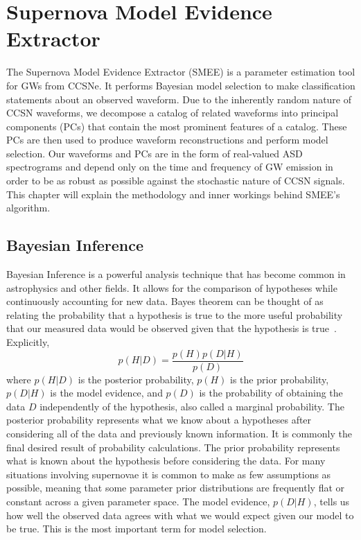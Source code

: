 \chapter{Supernova Model Evidence Extractor}
\label{chp:SMEE}

The Supernova Model Evidence Extractor (SMEE) is a parameter estimation tool for GWs from CCSNe. It performs Bayesian model selection to make classification statements about an observed waveform. Due to the inherently random nature of CCSN waveforms, we decompose a catalog of related waveforms into principal components (PCs) that contain the most prominent features of a catalog. These PCs are then used to produce waveform reconstructions and perform model selection. Our waveforms and PCs are in the form of real-valued ASD spectrograms and depend only on the time and frequency of GW emission in order to be as robust as possible against the stochastic nature of CCSN signals. This chapter will explain the methodology and inner workings behind SMEE's algorithm.

\section{Bayesian Inference}

Bayesian Inference is a powerful analysis technique that has become common in astrophysics and other fields. It allows for the comparison of hypotheses while continuously accounting for new data. Bayes theorem can be thought of as relating the probability that a hypothesis is true to the more useful probability that our measured data would be observed given that the hypothesis is true~\cite{thesis_josh}. Explicitly, 
\begin{equation}
\label{equ:Bayes}
    p(H|D) = \frac{p(H)p(D|H)}{p(D)}
\end{equation}
where $p(H|D)$ is the posterior probability, $p(H)$ is the prior probability, $p(D|H)$ is the model evidence, and $p(D)$ is the probability of obtaining the data $D$ independently of the hypothesis, also called a marginal probability. The posterior probability represents what we know about a hypotheses after considering all of the data and previously known information. It is commonly the final desired result of probability calculations. The prior probability represents what is known about the hypothesis before considering the data. For many situations involving supernovae it is common to make as few assumptions as possible, meaning that some parameter prior distributions are frequently flat or constant across a given parameter space. The model evidence, $p(D|H)$, tells us how well the observed data agrees with what we would expect given our model to be true. This is the most important term for model selection.


